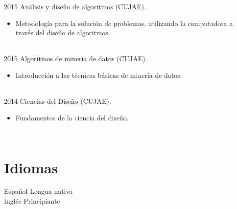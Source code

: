 \documentclass[letterpaper]{twentysecondcv} %
\begin{document}
\begin{twenty}
\twentyitem
    	{2015}
		{}
        {Análisis y diseño de algoritmos (CUJAE).}
        {}
        {}
        {
        {\begin{itemize}
        \item Metodología para la solución de problemas, utilizando la computadora a través del diseño de algoritmos.
		\end{itemize}}
        }
        \\
\twentyitem
    	{2015}
		{}
        {Algoritmos de minería de datos (CUJAE).}
        {}
        {}
        {
        {\begin{itemize}
        \item Introducción a las técnicas básicas de minería de datos.
		\end{itemize}}
        }
        \\
\twentyitem
    	{2014}
		{}
        {Ciencias del Diseño (CUJAE).}
        {}
        {}
        {
        {\begin{itemize}
        \item Fundamentos de la ciencia del diseño.
		\end{itemize}}
        }


\end{twenty}

\pagebreak

\begin{twenty}
\twentyitem
    	{}
		{}
        {}
        {}
        {}
        {}
        \\
 \end{twenty} 

\section{Idiomas}

\begin{twenty} %
\twentyitem
    	{Español}
		{}
        {Lengua nativa}
        {}
        {}
        {}
        \\
	\twentyitem
    	{Inglés}
		{}
        {Principiante}
        {}
        {}
        {}


\end{twenty}
\end{document}
